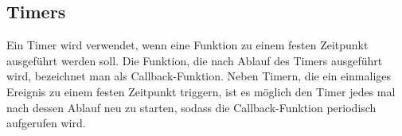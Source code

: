 \subsection{Timers}\label{subsec:Timers}
Ein Timer wird verwendet, wenn eine Funktion zu einem festen Zeitpunkt ausgeführt werden soll. Die Funktion, die nach Ablauf des Timers ausgeführt wird, bezeichnet man als Callback-Funktion. Neben Timern, die ein einmaliges Ereignis zu einem festen Zeitpunkt triggern, ist es möglich den Timer jedes mal nach dessen Ablauf neu zu starten, sodass die Callback-Funktion periodisch aufgerufen wird.

